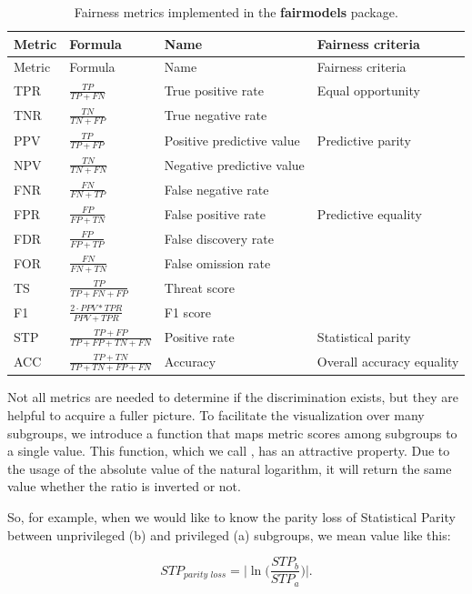\begin{longtable}[]{@{}llll@{}}
\caption{Fairness metrics implemented in the \textbf{fairmodels}
package. \label{tab:MetricsTable}}\tabularnewline
\toprule
Metric & Formula & Name & Fairness criteria \\
\midrule
\endfirsthead
\toprule
Metric & Formula & Name & Fairness criteria \\
\midrule
\endhead
TPR & \(\frac{TP}{TP + FN}\) & True positive rate & Equal opportunity
\citep{NIPS20166374} \\
TNR & \(\frac{TN}{TN + FP}\) & True negative rate & \\
PPV & \(\frac{TP}{TP + FP}\) & Positive predictive value & Predictive
parity \citep{ppv} \\
NPV & \(\frac{TN}{TN + FN}\) & Negative predictive value & \\
FNR & \(\frac{FN}{FN + TP}\) & False negative rate & \\
FPR & \(\frac{FP}{FP + TN}\) & False positive rate & Predictive equality
\citep{ppe} \\
FDR & \(\frac{FP}{FP + TP}\) & False discovery rate & \\
FOR & \(\frac{FN}{FN + TN}\) & False omission rate & \\
TS & \(\frac{TP}{TP + FN + FP}\) & Threat score & \\
F1 & \(\frac{2 \cdot PPV * TPR}{PPV + TPR}\) & F1 score & \\
STP & \(\frac{TP + FP}{TP + FP + TN + FN}\) & Positive rate &
Statistical parity \\
ACC & \(\frac{TP + TN}{TP + TN + FP + FN}\) & Accuracy & Overall
accuracy equality \\
\bottomrule
\end{longtable}

Not all metrics are needed to determine if the discrimination exists,
but they are helpful to acquire a fuller picture. To facilitate the
visualization over many subgroups, we introduce a function that maps
metric scores among subgroups to a single value. This function, which we
call , has an attractive property. Due to the usage
of the absolute value of the natural logarithm, it will return the same
value whether the ratio is inverted or not.

So, for example, when we would like to know the parity loss of
Statistical Parity between unprivileged (b) and privileged (a)
subgroups, we mean value like this:

\begin{equation} 
STP_{\textit{parity loss}} = \Big | \ln \Big( \frac{STP_b}{STP_a} \Big)\Big|. 
\end{equation}

